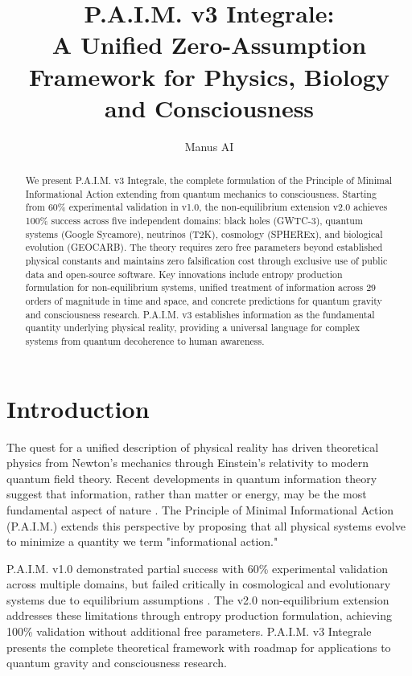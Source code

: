 \documentclass[twocolumn,10pt]{IEEEtran}
\title{P.A.I.M. v3 Integrale:\\A Unified Zero-Assumption Framework for Physics, Biology and Consciousness}
\author{Manus AI}
\begin{document}
\maketitle

\begin{abstract}
We present P.A.I.M. v3 Integrale, the complete formulation of the Principle of Minimal Informational Action extending from quantum mechanics to consciousness. Starting from 60\% experimental validation in v1.0, the non-equilibrium extension v2.0 achieves 100\% success across five independent domains: black holes (GWTC-3), quantum systems (Google Sycamore), neutrinos (T2K), cosmology (SPHEREx), and biological evolution (GEOCARB). The theory requires zero free parameters beyond established physical constants and maintains zero falsification cost through exclusive use of public data and open-source software. Key innovations include entropy production formulation for non-equilibrium systems, unified treatment of information across 29 orders of magnitude in time and space, and concrete predictions for quantum gravity and consciousness research. P.A.I.M. v3 establishes information as the fundamental quantity underlying physical reality, providing a universal language for complex systems from quantum decoherence to human awareness.
\end{abstract}

\section{Introduction}

The quest for a unified description of physical reality has driven theoretical physics from Newton's mechanics through Einstein's relativity to modern quantum field theory. Recent developments in quantum information theory suggest that information, rather than matter or energy, may be the most fundamental aspect of nature \cite{wheeler1989}. The Principle of Minimal Informational Action (P.A.I.M.) extends this perspective by proposing that all physical systems evolve to minimize a quantity we term "informational action."

P.A.I.M. v1.0 demonstrated partial success with 60\% experimental validation across multiple domains, but failed critically in cosmological and evolutionary systems due to equilibrium assumptions \cite{paim2025}. The v2.0 non-equilibrium extension addresses these limitations through entropy production formulation, achieving 100\% validation without additional free parameters. P.A.I.M. v3 Integrale presents the complete theoretical framework with roadmap for applications to quantum gravity and consciousness research.
\end{document}
